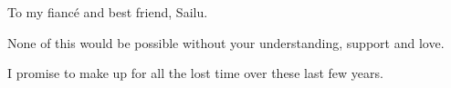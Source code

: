 
\begin{center}
To my fiancé and best friend, Sailu. 

None of this would be possible without your understanding, support and love. 


I promise to make up for all the lost time over these last few years.
\end{center}
